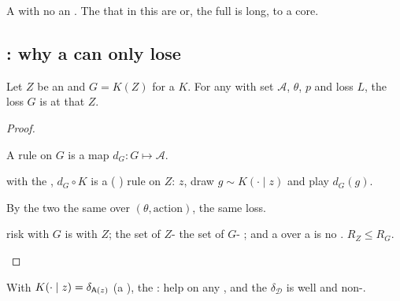 A  with no    an  . The  that 
 in this  are   or,  the full  is long,
 to a  core.

\subsection{: why a   can only lose}

\begin{theorem}
\label{thm:blackwell-proof}
Let $Z$ be an  and $G = K(Z)$ for a   $K$. For any
  with  set $\mathcal{A}$,  $\theta$,  $p$ and
loss $L$, the    loss  $G$ is at  that 
$Z$.
\end{theorem}
\begin{proof}
\begin{steps}
\item A  rule  on $G$ is a map $d_G : G \mapsto \mathcal{A}$.
\item {} with the , $d_G \circ K$ is a (
)  rule  on $Z$:  $z$, draw $g \sim K(\cdot\mid z)$
and play $d_G(g)$.
\item By  the two   the same 
 over $(\theta, \text{action})$,  the same  loss.
\item {}  risk  with $G$ is  with $Z$;
the set of $Z$-   the set of $G$- ; and a
 over a  is no .  $R_Z \le R_G$.
\end{steps}
\end{proof}

\begin{corollary}
With $K(\cdot\mid z)=\delta_{\mathsf{A}(z)}$ (a  ), the 
 :   help on any  , and the
 $\delta_{\mathcal{D}}$ is well  and non-.
\end{corollary}

